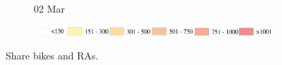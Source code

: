 \documentclass[ijgi,submit,moreauthors,pdftex]{Definitions/mdpi}
\begin{document}
\begin{figure}[H]
\begin{subfigure}{.3\textwidth}
        \caption{02 Mar}
    \end{subfigure}

    \vspace{6pt}
    \begin{subfigure}{.7\textwidth}
        \includegraphics[width=\textwidth]{Figures/AppendixLegend2-eps-converted-to.pdf}
    \end{subfigure}
    \caption{Share bikes and RAs.}
    \label{fig:BSS_communities}
\end{figure}
\end{document}
